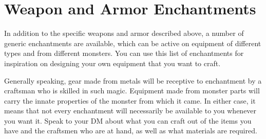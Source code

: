 \newpage
\section{Weapon and Armor Enchantments}
In addition to the specific weapons and armor described above, a number of generic enchantments are available, which can be active on equipment of different types and from different monsters. You can use this list of enchantments for inspiration on designing your own equipment that you want to craft.

Generally speaking, gear made from metals will be receptive to enchantment by a craftsman who is skilled in such magic. Equipment made from monster parts will carry the innate properties of the monster from which it came. In either case, it means that not every enchantment will necessarily be available to you whenever you want it. Speak to your DM about what you can craft out of the items you have and the craftsmen who are at hand, as well as what materials are required.

